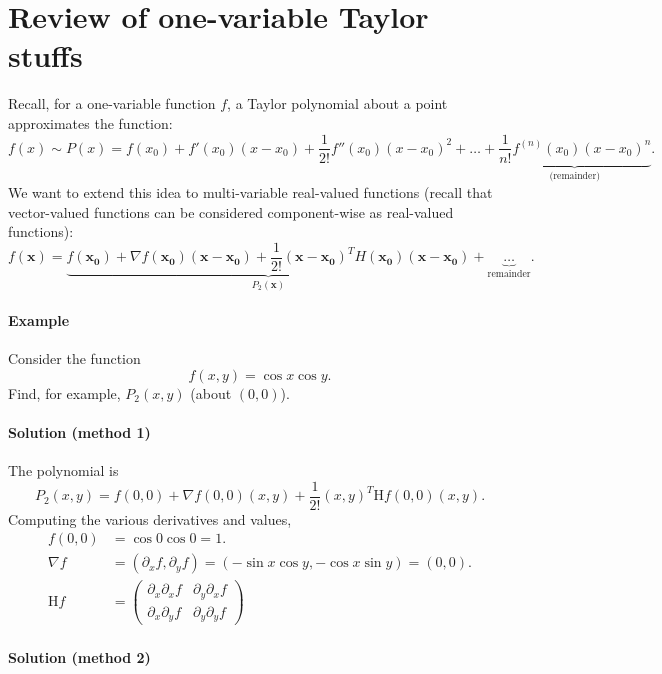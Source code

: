 \documentclass[11pt]{article}
\renewcommand{\vec}[1]{\bm{#1}}
\newcommand{\hessian}{\mathrm H}
\begin{document}
\section*{Review of one-variable Taylor stuffs}

Recall, for a one-variable function \(f\), a Taylor polynomial about a point approximates the function:
\[
    f(x) \sim P(x) = f(x_0) + f'(x_0) (x-x_0) + \frac{1}{2!} f''(x_0) (x-x_0)^2 + \dots +
        \underbrace{\frac{1}{n!} f^{(n)} (x_0) (x-x_0)^n}_\text{(remainder)}. 
\]
We want to extend this idea to multi-variable real-valued functions (recall that vector-valued functions can be considered component-wise as real-valued functions):
\[
    f(\vec x) = \underbrace{
        f(\vec {x_0}) + \nabla f(\vec {x_0}) (\vec x - \vec{x_0}) + \frac{1}{2!} (\vec x - \vec{x_0})^T H(\vec{x_0}) (\vec x - \vec{x_0})
    }_{P_2(\vec x)} + 
    \underbrace{\dots}_\text{remainder}.
\]

\paragraph{Example}

Consider the function
\[
    f(x, y) = \cos x \cos y.
\]
Find, for example, \(P_2(x, y)\) (about \((0, 0)\)).

\paragraph{Solution (method 1)}

The polynomial is
\[
    P_2(x, y) = f(0, 0) + \nabla f(0, 0) (x, y) + \frac{1}{2!} (x, y)^T \hessian f(0, 0) (x, y).
\]
Computing the various derivatives and values,
\begin{align*}
    f(0, 0) &= \cos 0 \cos 0 = 1. \\
    \nabla f &= (\partial_x f, \partial_y f) = (-\sin x \cos y, -\cos x \sin y) = (0, 0). \\
    \hessian f &=
        \begin{pmatrix}
            \partial_x \partial_x f & \partial_y \partial_x f \\
            \partial_x \partial_y f & \partial_y \partial_y f
        \end{pmatrix}
\end{align*}




\paragraph{Solution (method 2)}
\end{document}
